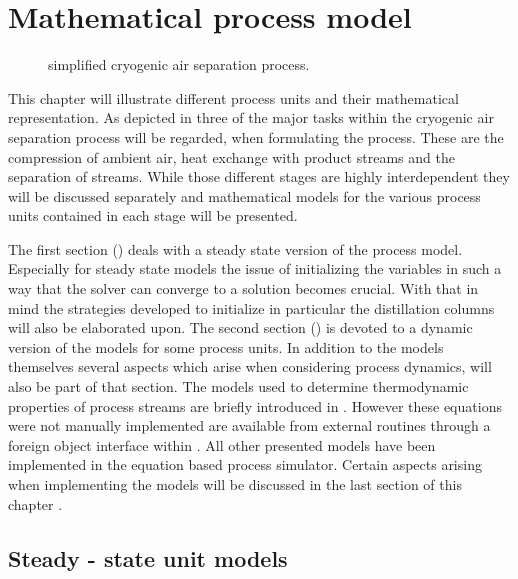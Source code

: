 \chapter{Mathematical process model}
\label{sec:mathprocess}

    \begin{figure}
        \center
        \footnotesize
        
        \caption{simplified cryogenic air separation process.}
        \label{fig:asu_simple}
    \end{figure}

    This chapter will illustrate different process units and their mathematical representation.
    As depicted in  three of the major tasks within the cryogenic air separation process will 
    be regarded, when formulating the process.
    These are the compression of ambient air, heat exchange with product streams and the separation of streams.
    While those different stages are highly interdependent they will be discussed separately and mathematical
    models for the various process units contained in each stage will be presented.

    The first section () deals with a steady state version of the process model. Especially
    for steady state models the issue of initializing the variables in such a way that the solver can converge to a solution
    becomes crucial. With that in mind the strategies developed to initialize in particular the distillation columns will also
    be elaborated upon.
    The second section () is devoted to a dynamic version of the models for some process units.
    In addition to the models themselves several aspects which arise when considering process dynamics, will also be part
    of that section.
    The models used to determine thermodynamic properties of process streams are briefly introduced in . 
    However these equations were not manually implemented are available from external routines through a foreign object 
    interface within \gproms. 
    All other presented models have been implemented in the equation based process simulator. Certain aspects arising when
    implementing the models will be discussed in the last section of this chapter .


    \section{Steady - state unit models}
    \label{sec:mathpro:steady}
        

